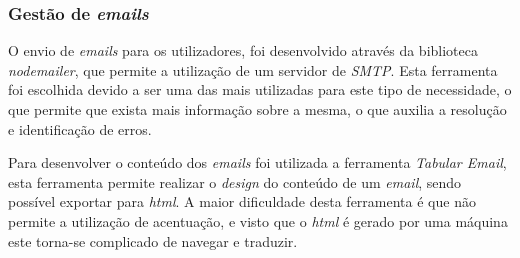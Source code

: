 \subsubsection{Gestão de \textit{emails}}
O envio de \textit{emails} para os utilizadores, foi desenvolvido através da biblioteca \textit{nodemailer}, que permite a utilização de um servidor de \textit{SMTP}. Esta ferramenta foi escolhida devido a ser uma das mais utilizadas para este tipo de necessidade, o que permite que exista mais informação sobre a mesma, o que auxilia a resolução e identificação de erros. 

Para desenvolver o conteúdo dos \textit{emails} foi utilizada a ferramenta \textit{Tabular Email}, esta ferramenta permite realizar o \textit{design} do conteúdo de um \textit{email}, sendo possível exportar para \textit{html}. A maior dificuldade desta ferramenta é que não permite a utilização de acentuação, e visto que o \textit{html} é gerado por uma máquina este torna-se complicado de navegar e traduzir.